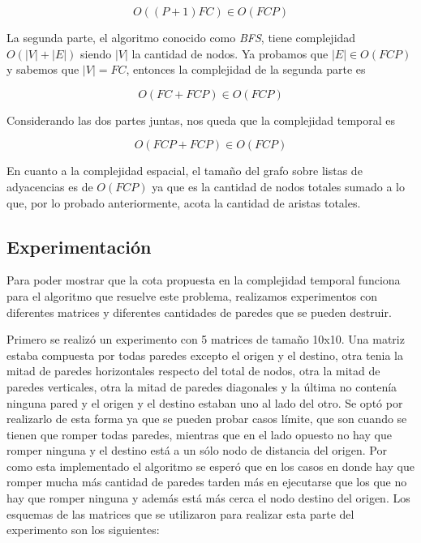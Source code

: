 \begin{itemize}
      \[
        O((P+1)FC) \in O(FCP)
      \]


      La segunda parte, el algoritmo conocido como \textit{BFS}, tiene complejidad $O(|V| + |E|)$ siendo $|V|$ la cantidad de nodos. Ya probamos que $|E| \in O(FCP)$ y sabemos que $|V| = FC$, entonces la complejidad de la segunda parte es

      \[
        O(FC + FCP) \in O(FCP)
      \]

      Considerando las dos partes juntas, nos queda que la complejidad temporal es

      \[
        O(FCP + FCP) \in O(FCP)
      \]

      En cuanto a la complejidad espacial, el tamaño del grafo sobre listas de adyacencias es de $O(FCP)$ ya que es la cantidad de nodos totales sumado a lo que, por lo probado anteriormente, acota la cantidad de aristas totales.



    \subsection{Experimentación}

	Para poder mostrar que la cota propuesta en la complejidad temporal funciona para el algoritmo que resuelve este problema, realizamos experimentos con diferentes matrices y diferentes cantidades de paredes que se pueden destruir.

  Primero se realizó un experimento con 5 matrices de tamaño 10x10. Una matriz estaba compuesta por todas paredes excepto el origen y el destino, otra tenia la mitad de paredes horizontales respecto del total de nodos, otra la mitad de paredes verticales, otra la mitad de paredes diagonales y la última no contenía ninguna pared y el origen y el destino estaban uno al lado del otro. Se optó por realizarlo de esta forma ya que se pueden probar casos límite, que son cuando se tienen que romper todas paredes, mientras que en el lado opuesto no hay que romper ninguna y el destino está a un sólo nodo de distancia del origen. Por como esta implementado el algoritmo se esperó que en los casos en donde hay que romper mucha más cantidad de paredes tarden más en ejecutarse que los que no hay que romper ninguna y además está más cerca el nodo destino del origen. Los esquemas de las matrices que se utilizaron para realizar esta parte del experimento son los siguientes:


\end{itemize}

